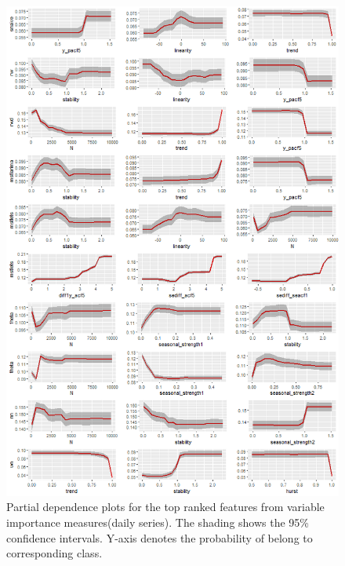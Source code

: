 \documentclass[11pt,a4paper,]{article}
\begin{document}
\newpage

\begin{figure}
\centering
\includegraphics{figures/dailypdp-1.png}
\caption{\label{fig:dailypdp}Partial dependence plots for the top ranked
features from variable importance measures(daily series). The shading
shows the 95\% confidence intervals. Y-axis denotes the probability of
belong to corresponding class.}
\end{figure}

\newpage
\end{document}
